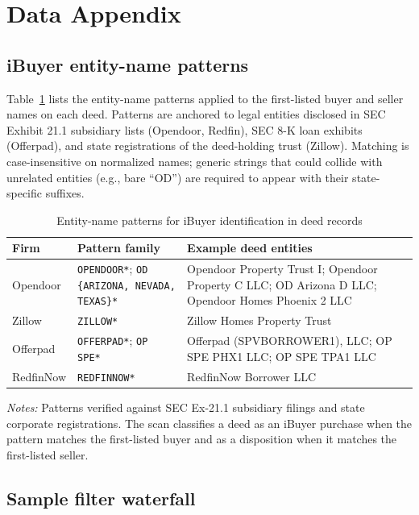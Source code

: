\section{Data Appendix}\label{app:data}

\subsection{iBuyer entity-name patterns}\label{app:data-entities}

Table~\ref{tab:entities} lists the entity-name patterns applied to the first-listed buyer and seller names on each deed. Patterns are anchored to legal entities disclosed in SEC Exhibit 21.1 subsidiary lists (Opendoor, Redfin), SEC 8-K loan exhibits (Offerpad), and state registrations of the deed-holding trust (Zillow). Matching is case-insensitive on normalized names; generic strings that could collide with unrelated entities (e.g., bare ``OD'') are required to appear with their state-specific suffixes.

\begin{table}[h!]
\centering
\caption{Entity-name patterns for iBuyer identification in deed records}
\label{tab:entities}
\small
\begin{tabular}{p{1.7cm} p{4.6cm} p{5.9cm}}
\toprule
Firm & Pattern family & Example deed entities \\
\midrule
Opendoor & \texttt{OPENDOOR*}; \texttt{OD \{ARIZONA, NEVADA, TEXAS\}*} & Opendoor Property Trust I; Opendoor Property C LLC; OD Arizona D LLC; Opendoor Homes Phoenix 2 LLC \\
Zillow & \texttt{ZILLOW*} & Zillow Homes Property Trust \\
Offerpad & \texttt{OFFERPAD*}; \texttt{OP SPE*} & Offerpad (SPVBORROWER1), LLC; OP SPE PHX1 LLC; OP SPE TPA1 LLC \\
RedfinNow & \texttt{REDFINNOW*} & RedfinNow Borrower LLC \\
\bottomrule
\end{tabular}
\par\smallskip
\raggedright\footnotesize\emph{Notes:} Patterns verified against SEC Ex-21.1 subsidiary filings and state corporate registrations. The scan classifies a deed as an iBuyer purchase when the pattern matches the first-listed buyer and as a disposition when it matches the first-listed seller.
\end{table}

\subsection{Sample filter waterfall}\label{app:data-waterfall}

